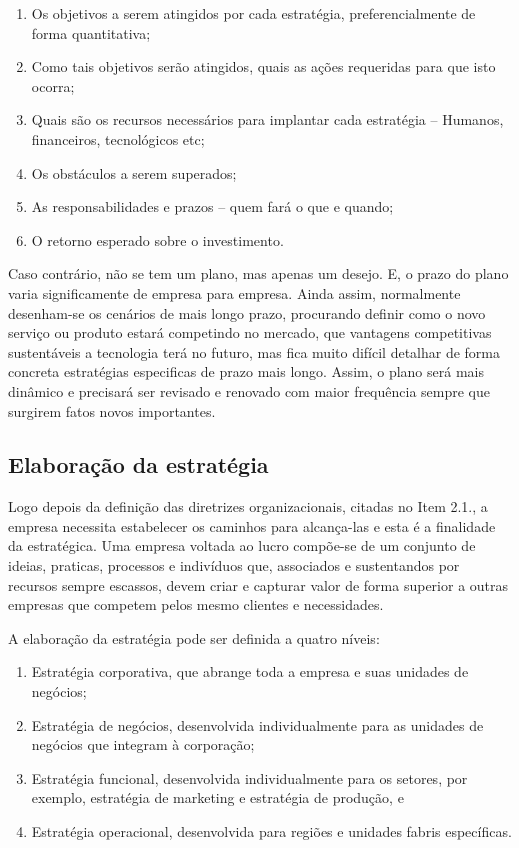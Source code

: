 \documentclass[
	12pt,				%
	openright,			%
	oneside,			%
	a4paper,			%
	english,			%
	french,				%
	spanish,			%
	brazil				%
	]{abntex2}
\begin{document}
	\begin{enumerate}
		\item Os objetivos a serem atingidos por cada estratégia, preferencialmente de forma quantitativa;
		\item Como tais objetivos serão atingidos, quais as ações requeridas para que isto ocorra;
		\item Quais são os recursos necessários para implantar cada estratégia – Humanos, financeiros, tecnológicos etc;
		\item Os obstáculos a serem superados;
		\item As responsabilidades e prazos – quem fará o que e quando;
		\item O retorno esperado sobre o investimento.
	\end{enumerate}
		
	Caso contrário, não se tem um plano, mas apenas um desejo. E, o prazo do plano varia significamente de empresa para empresa. Ainda assim, normalmente desenham-se os cenários de mais longo prazo, procurando definir como o novo serviço ou produto estará competindo no mercado, que vantagens competitivas sustentáveis a tecnologia terá no futuro, mas fica muito difícil detalhar de forma concreta estratégias especificas de prazo mais longo. Assim, o plano será mais dinâmico e precisará ser revisado e renovado com maior frequência sempre que surgirem fatos novos importantes.
		
\subsection[Elaboração da estratégia]{Elaboração da estratégia}

	Logo depois da definição das diretrizes organizacionais, citadas no Item 2.1., a empresa necessita estabelecer os caminhos para alcança-las e esta é a finalidade da estratégica. Uma empresa voltada ao lucro compõe-se de um conjunto de ideias, praticas, processos e indivíduos que, associados e sustentandos por recursos sempre escassos, devem criar e capturar valor de forma superior a outras empresas que competem pelos mesmo clientes e necessidades.
	
	A elaboração da estratégia pode ser definida a quatro níveis:

	\begin{enumerate}
		\item Estratégia corporativa, que abrange toda a empresa e suas unidades de negócios;
		\item Estratégia de negócios, desenvolvida individualmente para as unidades de negócios que integram à corporação;
		\item Estratégia funcional, desenvolvida individualmente para os setores, por exemplo, estratégia de marketing e estratégia de produção, e
		\item Estratégia operacional, desenvolvida para regiões e unidades fabris específicas.
	\end{enumerate}
	
\end{document}
